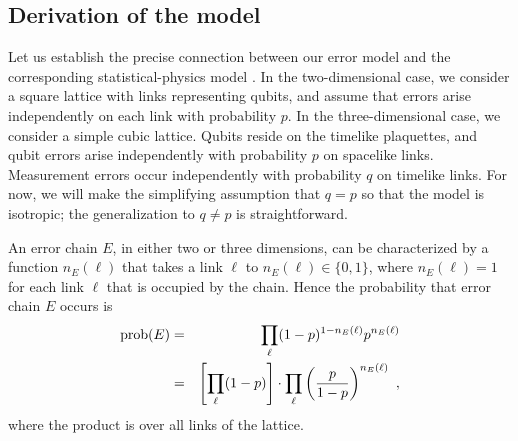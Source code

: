 \subsection{Derivation of the model}

Let us establish the precise connection between our error model and the corresponding
statistical-physics model . In the two-dimensional case, we consider a
square lattice with links representing
qubits, and assume that errors arise independently on each link with probability $p$.
In the three-dimensional case, we consider a simple cubic lattice. Qubits reside on the timelike plaquettes, and qubit errors arise independently with probability $p$ on spacelike links. Measurement errors occur independently with probability $q$ on timelike links. For now, we will make the simplifying assumption that $q=p$ so that the model is isotropic; the generalization to $q\ne p$ is straightforward.

An error chain $E$, in either two or three dimensions, can be characterized by a function
$n_E(\ell) $ that takes a link $\ell$ to $n_E(\ell)\in \{0, 1\}$, where
$n_E(\ell) = 1$ for each link $\ell$ that is occupied by the chain.  Hence
the probability that error chain $E$ occurs is
\begin{eqnarray}
{\rm prob}(E) &=& {\prod_\ell} (1 - p)^{1 - n_E(\ell)} p^{n_E(\ell)}
\nonumber \\
&=& \left[{\prod_\ell} (1 - p)\right] \cdot {\prod_\ell} \left(\frac{p}{1 -
p}\right)^{n_E(\ell)}~,
\end{eqnarray}
where the product is over all links of the lattice.

